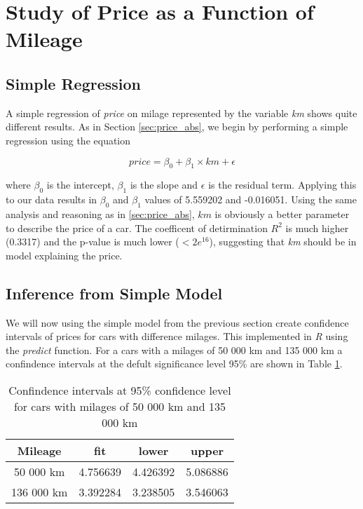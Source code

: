 \section{Study of Price as a Function of Mileage} %
\label{sec:price_km}

\subsection{Simple Regression} %
\label{sub:simple_regression}

A simple regression of \textit{price} on milage represented by the variable \textit{km} shows quite different results. As in Section \ref{sec:price_abs}, we begin by performing a simple regression using the equation

\begin{equation}\label{eq:price_km}
	price = \beta_0 + \beta_1 \times km + \epsilon
\end{equation}

\noindent
where $\beta_0$ is the intercept, $\beta_1$ is the slope and $\epsilon$ is the residual term. Applying this to our data results in $\beta_0$ and $\beta_1$ values of 5.559202 and -0.016051. Using the same analysis and reasoning as in \ref{sec:price_abs}, $km$ is obviously a better parameter to describe the price of a car. The coefficent of detirmination $R^2$ is much higher (0.3317) and the p-value is much lower ($<2e^{16}$), suggesting that \textit{km} should be in model explaining the price.


\subsection{Inference from Simple Model} %
\label{sub:inference_from_simple_model}

We will now using the simple model from the previous section create confidence intervals of prices for cars with difference milages. This implemented in \textit{R} using the \textit{predict} function. For a cars with a milages of 50 000 km and 135 000 km a confindence intervals at the defult significance level 95\% are shown in Table \ref{tab:confint_km}.

\begin{table}[H]
\centering
\begin{tabular}{||c |c c c||} 
 \hline
 Mileage & fit & lower & upper \\ [0.5ex]
 \hline
 50 000 km & 4.756639 & 4.426392 & 5.086886 \\ 
 136 000 km & 3.392284 & 3.238505 & 3.546063 \\
 \hline
\end{tabular}
\caption{Confindence intervals at 95\% confidence level for cars with milages of 50 000 km and 135 000 km}
\label{tab:confint_km}
\end{table}

